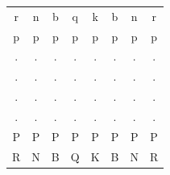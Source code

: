 \begin{tabular}{@{}cccccccc@{}}
    r & n & b & q & k & b & n & r \\[1ex]
    p & p & p & p & p & p & p & p \\[1ex]
    . & . & . & . & . & . & . & . \\[1ex]
    . & . & . & . & . & . & . & . \\[1ex]
    . & . & . & . & . & . & . & . \\[1ex]
    . & . & . & . & . & . & . & . \\[1ex]
    P & P & P & P & P & P & P & P \\[1ex]
    R & N & B & Q & K & B & N & R \\[1ex]
\end{tabular}
